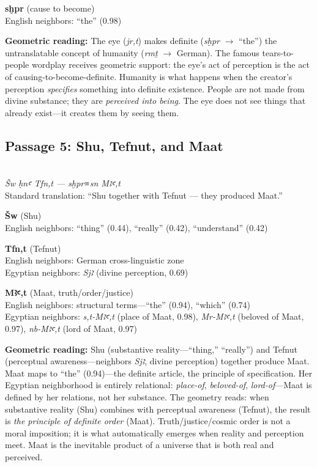 \documentclass[11pt, a4paper]{article}
\newcommand{\passagehiero}[1]{{\normalfont\hierofont\fontsize{14}{17}\selectfont #1}}
\begin{document}
\medskip

\noindent\textbf{sḫpr} (cause to become)\\
English neighbors: ``the'' (0.98)

\medskip

{\color{insight}\textbf{Geometric reading:}} The eye (\textit{jr,t}) makes definite (\textit{sḫpr} $\to$ ``the'') the untranslatable concept of humanity (\textit{rmṯ} $\to$ German). The famous tears-to-people wordplay receives geometric support: the eye's act of perception is the act of causing-to-become-definite. Humanity is what happens when the creator's perception \textit{specifies} something into definite existence. People are not made from divine substance; they are \textit{perceived into being}. The eye does not see things that already exist---it creates them by seeing them.

\subsection{Passage 5: Shu, Tefnut, and Maat}

{\color{passage}\passagehiero{𓆄𓅱 𓎛𓈖𓂝 𓏏𓆑𓈖𓏏 --- 𓋴𓆣𓂋𓊃𓈖 𓆄𓏏}\\\medskip
\textit{\small Šw ḥnꜥ Tfn,t --- sḫpr≡sn Mꜣꜥ,t}\\
Standard translation: ``Shu together with Tefnut --- they produced Maat.''}

\bigskip

\noindent\textbf{Šw} (Shu)\\
English neighbors: ``thing'' (0.44), ``really'' (0.42), ``understand'' (0.42)

\medskip

\noindent\textbf{Tfn,t} (Tefnut)\\
English neighbors: German cross-linguistic zone\\
Egyptian neighbors: \textit{Sjꜣ} (divine perception, 0.69)

\medskip

\noindent\textbf{Mꜣꜥ,t} (Maat, truth/order/justice)\\
English neighbors: structural terms---``the'' (0.94), ``which'' (0.74)\\
Egyptian neighbors: \textit{s,t-Mꜣꜥ,t} (place of Maat, 0.98), \textit{Mr-Mꜣꜥ,t} (beloved of Maat, 0.97), \textit{nb-Mꜣꜥ,t} (lord of Maat, 0.97)

\medskip

{\color{insight}\textbf{Geometric reading:}} Shu (substantive reality---``thing,'' ``really'') and Tefnut (perceptual awareness---neighbors \textit{Sjꜣ}, divine perception) together produce Maat. Maat maps to ``the'' (0.94)---the definite article, the principle of specification. Her Egyptian neighborhood is entirely relational: \textit{place-of}, \textit{beloved-of}, \textit{lord-of}---Maat is defined by her relations, not her substance. The geometry reads: when substantive reality (Shu) combines with perceptual awareness (Tefnut), the result is \textit{the principle of definite order} (Maat). Truth/justice/cosmic order is not a moral imposition; it is what automatically emerges when reality and perception meet. Maat is the inevitable product of a universe that is both real and perceived.
\end{document}
